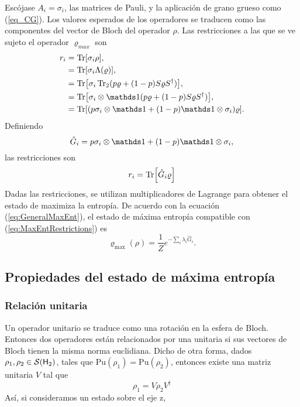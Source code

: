 Escójase ${A_{i}}={\sigma_{i}}$, las matrices de Pauli, y la aplicación de grano grueso como (\ref{eq_CG}). Los valores esperados de los operadores se traducen como las componentes del vector de Bloch del operador $\rho$. Las restricciones a las que se ve sujeto el operador $\varrho_{max}$ son
\begin{align*}
    r_{i}&=\Tr[\sigma_{i}\rho],\\
    &=\Tr[\sigma_{i}\Lambda(\varrho)],\\
    &=\Tr[\sigma_{i}\Tr_{2}(p\varrho+(1-p)S\varrho S^{\dag})],\\
    &=\Tr[\sigma_{i}\otimes\Id(p\varrho+(1-p)S\varrho S^{\dag})],\\
    &=\Tr[(p\sigma_{i}\otimes\Id+(1-p)\Id\otimes\sigma_{i})\varrho].
\end{align*}
Definiendo
\begin{equation}\label{eq:Ghat}
    \hat{G}_{i}=p\sigma_{i}\otimes\Id+(1-p)\Id\otimes\sigma_{i},
\end{equation}
las restricciones son
\begin{equation}\label{eq:MaxEntRestrictions}
    r_{i}=\Tr[\hat{G}_{i}\varrho]
\end{equation}
Dadas las restricciones, se utilizan multiplicadores de Lagrange para obtener el estado de maximiza la entropía. De acuerdo con la ecuación (\ref{eq:GeneralMaxEnt}), el estado de máxima entropía compatible con (\ref{eq:MaxEntRestrictions}) es
\begin{equation}
    \varrho_{\max}(\rho)=\frac{1}{Z}e^{-\sum_{i}\lambda_{i}\hat{G}_{i}}.
\end{equation}

\subsection{Propiedades del estado de máxima entropía}

\subsubsection{Relación unitaria}

Un operador unitario se traduce como una rotación en la esfera de Bloch. Entonces dos operadores están relacionados por una unitaria si sus vectores de Bloch tienen la misma norma euclidiana. Dicho de otra forma, dados $\rho_{1},\rho_{2}\in\mathcal{S}({\sf H}_{2})$, tales que $\text{Pu}(\rho_{1})=\text{Pu}(\rho_{2})$, entonces existe una matriz unitaria $V$ tal que
\begin{equation}
    \rho_{1}=V\rho_{2}V^{\dag}
\end{equation}
Así, si consideramos un estado sobre el eje z,

